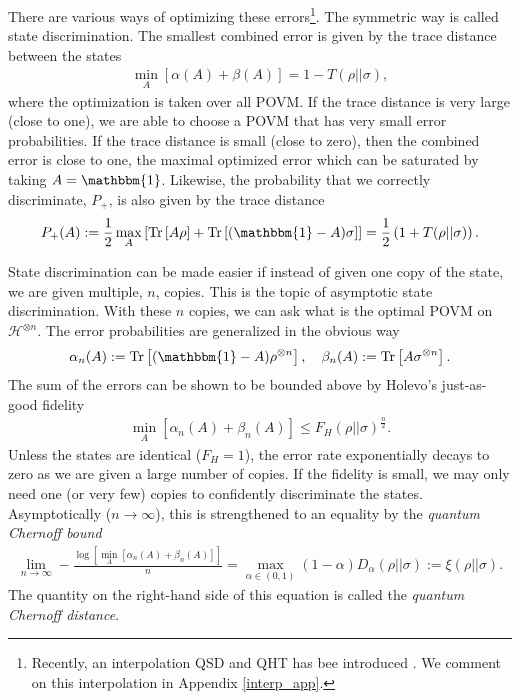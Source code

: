 \documentclass[a4paper,11pt]{article}
\newcommand{\Tr}{\text{Tr}}
\begin{document}
There are various ways of optimizing these errors\footnote{Recently, an interpolation QSD and QHT has bee introduced \cite{2021arXiv210409553S}. We comment on this interpolation in Appendix \ref{interp_app}.}. The symmetric way is called state discrimination. The smallest combined error is given by the trace distance between the states \cite{1969JSP.....1..231H, Helstrom:110988}
\begin{align}
    \min_{A}\left[ \alpha(A) + \beta(A) \right] = 1 - T(\rho || \sigma),
    \label{trace_distance_operational}
\end{align}
where the optimization is taken over all POVM. If the trace distance is very large (close to one), we are able to choose a POVM that has very small error probabilities. If the trace distance is small (close to zero), then the combined error is close to one, the maximal optimized error which can be saturated by taking $A = \mathbbm{1}$. Likewise, the probability that we correctly discriminate, $P_+$, is also given by the trace distance
\begin{align}
     P_+(A) := \frac{1}{2}\max_A\left[\Tr \left[ A \rho \right] + \Tr \left[ (\mathbbm{1} - A)\sigma\right]\right] = \frac{1}{2} \left(1+ T(\rho || \sigma)\right).
\end{align}

State discrimination can be made easier if instead of given one copy of the state, we are given multiple, $n$, copies. This is the topic of asymptotic state discrimination. With these $n$ copies, we can ask what is the optimal POVM on $\mathcal{H}^{\otimes n}$. The error probabilities are generalized in the obvious way
\begin{align}
    \alpha_n(A):= \Tr \left[ (\mathbbm{1} - A)\rho^{\otimes n}\right], \quad \beta_n(A):= \Tr \left[ A \sigma^{\otimes n} \right].
\end{align}
The sum of the errors can be shown to be bounded above by Holevo's just-as-good fidelity
\begin{align}
    \min_{A}\left[ \alpha_n(A) + \beta_n(A) \right] \leq  F_H(\rho || \sigma)^{\frac{n}{2}}.
\end{align}
Unless the states are identical ($F_H = 1$), the error rate exponentially decays to zero as we are given a large number of copies. If the fidelity is small, we may only need one (or very few) copies to confidently discriminate the states. Asymptotically ($n \rightarrow \infty$), this is strengthened to an equality by the \textit{quantum Chernoff bound} \cite{2007PhRvL..98p0501A,2006quant.ph..7216N}
\begin{align}
    \lim_{n\rightarrow \infty}- \frac{\log\left[\min_{A}\left[ \alpha_n(A) + \beta_n(A) \right]\right] }{n}=\max_{\alpha \in (0, 1)}(1-\alpha)D_{\alpha}(\rho || \sigma):= \xi(\rho||\sigma).
    \label{chernoff_bound}
\end{align}
The quantity on the right-hand side of this equation is called the \textit{quantum Chernoff distance}.
\end{document}
